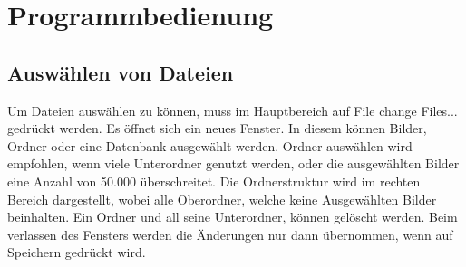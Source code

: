 \section*{Programmbedienung}
\subsection*{Auswählen von Dateien}
Um Dateien auswählen zu können, muss im Hauptbereich auf File \textrightarrow change Files... gedrückt werden. Es öffnet sich ein neues Fenster. In diesem können Bilder, Ordner oder eine Datenbank ausgewählt werden. Ordner auswählen wird empfohlen, wenn viele Unterordner genutzt werden, oder die ausgewählten Bilder eine Anzahl von 50.000 überschreitet. Die Ordnerstruktur wird im rechten Bereich dargestellt, wobei alle Oberordner, welche keine Ausgewählten Bilder beinhalten. Ein Ordner und all seine Unterordner, können gelöscht werden. Beim verlassen des Fensters werden die Änderungen nur dann übernommen, wenn auf Speichern gedrückt wird.
\begin{figure}[h]
    \centering
    \label{Dateien Auswählen}
\end{figure}

